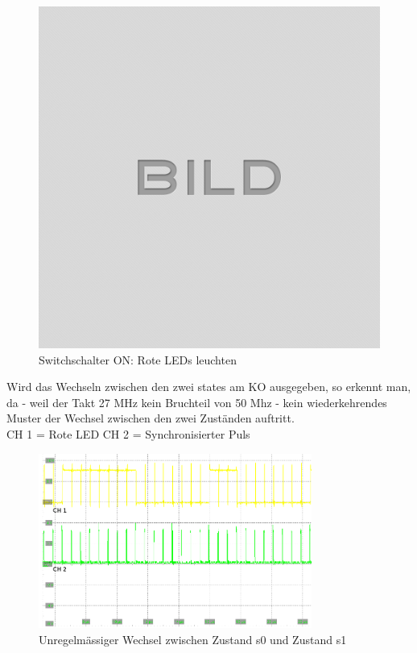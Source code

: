 \begin{figure}[H]
	\centering
	\includegraphics[width=1\textwidth]{images/idle.png}
	\caption{Switchschalter ON: Rote LEDs leuchten}
	\label{fig.metastabil.Ergebnis_BoardSynchron}
\end{figure}

\newpage
Wird das Wechseln zwischen den zwei states am KO ausgegeben, so erkennt man, da - weil der Takt 27 MHz kein Bruchteil von 50 Mhz - kein wiederkehrendes Muster der Wechsel zwischen den zwei Zuständen auftritt. \\
CH 1 = Rote LED
CH 2 = Synchronisierter Puls\\

\begin{figure}[H]
	\centering
	\includegraphics[width=0.8\textwidth]{images/metastability/synchron_eng_2.png}
	\caption{Unregelmässiger Wechsel zwischen Zustand s0 und Zustand s1}
	\label{fig.metastabil.Ergebnis_1}
\end{figure}

